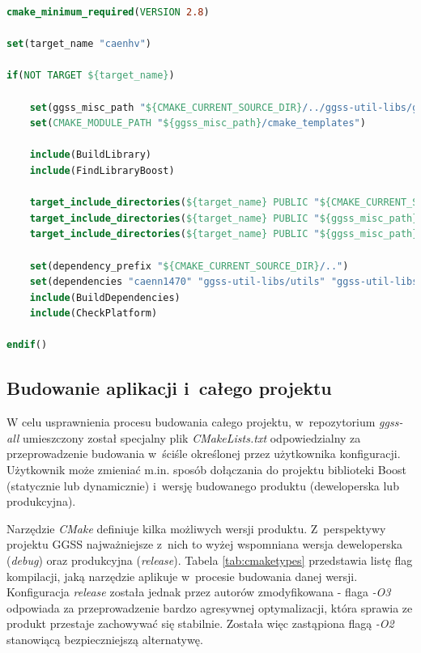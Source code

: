 \newpage

\begin{lstlisting}[language=cmake, caption={Plik \textit{CMakeLists.txt} służący do budowania biblioteki \textit{caenhv}. Widoczne zastosowanie m.in. plików \textit{BuildLibrary.cmake} oraz \textit{BuildDependencies.cmake}.},label={lst:caenhvcmake}]
cmake_minimum_required(VERSION 2.8)

set(target_name "caenhv")

if(NOT TARGET ${target_name})
   
    set(ggss_misc_path "${CMAKE_CURRENT_SOURCE_DIR}/../ggss-util-libs/ggss-misc")
    set(CMAKE_MODULE_PATH "${ggss_misc_path}/cmake_templates")

    include(BuildLibrary)
    include(FindLibraryBoost)

    target_include_directories(${target_name} PUBLIC "${CMAKE_CURRENT_SOURCE_DIR}/include/CaenHVLib")
    target_include_directories(${target_name} PUBLIC "${ggss_misc_path}/include")
    target_include_directories(${target_name} PUBLIC "${ggss_misc_path}")

    set(dependency_prefix "${CMAKE_CURRENT_SOURCE_DIR}/..")
    set(dependencies "caenn1470" "ggss-util-libs/utils" "ggss-util-libs/thread")
    include(BuildDependencies)
    include(CheckPlatform)

endif()
\end{lstlisting}



\subsection{Budowanie aplikacji i~całego projektu} 
W celu usprawnienia procesu budowania całego projektu, w~repozytorium \textit{ggss-all} umieszczony został specjalny plik \textit{CMakeLists.txt} odpowiedzialny za przeprowadzenie budowania w~ściśle określonej przez użytkownika konfiguracji. Użytkownik może zmieniać m.in. sposób dołączania do projektu biblioteki Boost (statycznie lub dynamicznie) i~wersję budowanego produktu (deweloperska lub produkcyjna). 

Narzędzie \textit{CMake} definiuje kilka możliwych wersji produktu. Z~perspektywy projektu GGSS najważniejsze z~nich to wyżej wspomniana wersja deweloperska (\textit{debug}) oraz produkcyjna (\textit{release}). Tabela \ref{tab:cmaketypes} przedstawia listę flag kompilacji, jaką narzędzie aplikuje w~procesie budowania danej wersji. Konfiguracja \textit{release} została jednak przez autorów zmodyfikowana - flaga \textit{-O3} odpowiada za przeprowadzenie bardzo agresywnej optymalizacji, która sprawia ze produkt przestaje zachowywać się stabilnie. Została więc zastąpiona flagą \textit{-O2} stanowiącą bezpieczniejszą alternatywę. 

